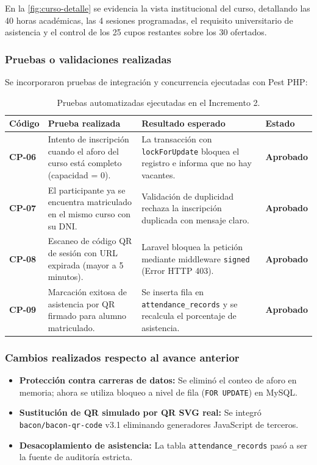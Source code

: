En la \cref{fig:curso-detalle} se evidencia la vista institucional del curso, detallando las 40 horas académicas, las 4 sesiones programadas, el requisito universitario de asistencia y el control de los 25 cupos restantes sobre los 30 ofertados.

\subsubsection{Pruebas o validaciones realizadas}
Se incorporaron pruebas de integración y concurrencia ejecutadas con Pest PHP:

\begin{table}[H]
\centering
\small
\begin{tabularx}{\textwidth}{P{1.8cm} P{4.8cm} P{4.5cm} Y}
\toprule
\textbf{Código} & \textbf{Prueba realizada} & \textbf{Resultado esperado} & \textbf{Estado} \\
\midrule
\textbf{CP-06} & Intento de inscripción cuando el aforo del curso está completo (capacidad = 0). & La transacción con \texttt{lockForUpdate} bloquea el registro e informa que no hay vacantes. & \textbf{Aprobado} \\
\addlinespace
\textbf{CP-07} & El participante ya se encuentra matriculado en el mismo curso con su DNI. & Validación de duplicidad rechaza la inscripción duplicada con mensaje claro. & \textbf{Aprobado} \\
\addlinespace
\textbf{CP-08} & Escaneo de código QR de sesión con URL expirada (mayor a 5 minutos). & Laravel bloquea la petición mediante middleware \texttt{signed} (Error HTTP 403). & \textbf{Aprobado} \\
\addlinespace
\textbf{CP-09} & Marcación exitosa de asistencia por QR firmado para alumno matriculado. & Se inserta fila en \texttt{attendance\_records} y se recalcula el porcentaje de asistencia. & \textbf{Aprobado} \\
\bottomrule
\end{tabularx}
\caption{Pruebas automatizadas ejecutadas en el Incremento 2.}
\label{tab:pruebas_inc2}
\end{table}

\subsubsection{Cambios realizados respecto al avance anterior}
\begin{itemize}[nosep]
    \item \textbf{Protección contra carreras de datos:} Se eliminó el conteo de aforo en memoria; ahora se utiliza bloqueo a nivel de fila (\texttt{FOR UPDATE}) en MySQL.
    \item \textbf{Sustitución de QR simulado por QR SVG real:} Se integró \texttt{bacon/bacon-qr-code} v3.1 eliminando generadores JavaScript de terceros.
    \item \textbf{Desacoplamiento de asistencia:} La tabla \texttt{attendance\_records} pasó a ser la fuente de auditoría estricta.
\end{itemize}

